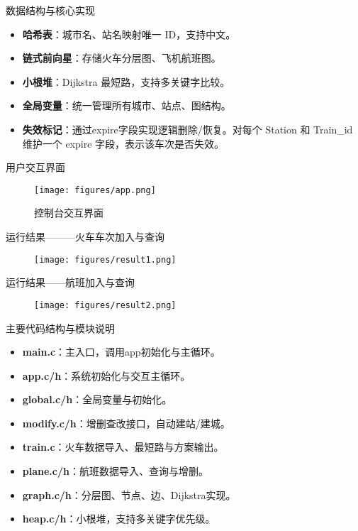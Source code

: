 \documentclass{beamer}
\begin{document}
\begin{frame}{数据结构与核心实现}
  \begin{itemize}
    \item \textbf{哈希表}：城市名、站名映射唯一 ID，支持中文。
    \item \textbf{链式前向星}：存储火车分层图、飞机航班图。
    \item \textbf{小根堆}：Dijkstra 最短路，支持多关键字比较。
    \item \textbf{全局变量}：统一管理所有城市、站点、图结构。
    \item \textbf{失效标记}：通过expire字段实现逻辑删除/恢复。对每个 Station 和 Train\_id 维护一个 expire 字段，表示该车次是否失效。
  \end{itemize}
\end{frame}

\begin{frame}{用户交互界面}
    \begin{figure}
        \centering
        \texttt{[image: figures/app.png]}
        \caption*{控制台交互界面}
    \end{figure}
\end{frame}

\begin{frame}{运行结果———火车车次加入与查询}
    \begin{figure}
        \centering
        \texttt{[image: figures/result1.png]}
    \end{figure}
\end{frame}

\begin{frame}{运行结果——航班加入与查询}
    \begin{figure}
        \centering
        \texttt{[image: figures/result2.png]}
    \end{figure}
\end{frame}

\begin{frame}{主要代码结构与模块说明}
  \begin{itemize}
    \item \textbf{main.c}：主入口，调用app初始化与主循环。
    \item \textbf{app.c/h}：系统初始化与交互主循环。
    \item \textbf{global.c/h}：全局变量与初始化。
    \item \textbf{modify.c/h}：增删查改接口，自动建站/建城。
    \item \textbf{train.c}：火车数据导入、最短路与方案输出。
    \item \textbf{plane.c/h}：航班数据导入、查询与增删。
    \item \textbf{graph.c/h}：分层图、节点、边、Dijkstra实现。
    \item \textbf{heap.c/h}：小根堆，支持多关键字优先级。
  \end{itemize}
\end{frame}
\end{document}
